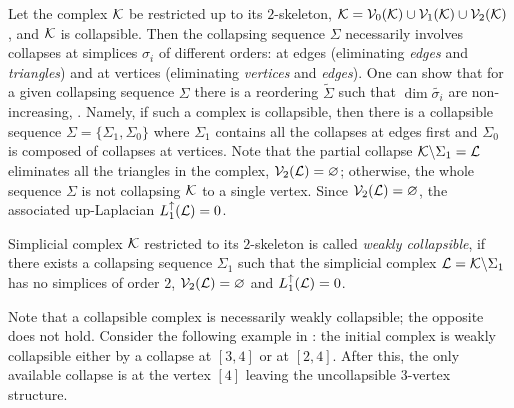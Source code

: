 Let the complex \( \mathcal{K} \) be restricted up to its \(2\)-skeleton, \( \mathcal{K} = \mathcal{V}_{0}(\mathcal{K}) \cup \mathcal{V}_{1}(\mathcal{K}) \cup \mathcal{V}_{2}(\mathcal{K}) \), and \( \mathcal{K} \) is collapsible. Then the collapsing sequence \( \Sigma \) necessarily involves collapses at simplices \( \sigma_i \) of different orders: at edges (eliminating \emph{edges} and \emph{triangles}) and at vertices (eliminating \emph{vertices} and \emph{edges}). One can show that for a given collapsing sequence \( \Sigma \) there is a reordering \( \tilde \Sigma \) such that \( \dim \tilde{\sigma_i} \) are non-increasing, {\cite[Lemma 2.5]{cohenSolving1laplaciansNearly2014}}. Namely, if such a complex is collapsible, then there is a collapsible sequence \( \Sigma = \{ \Sigma_1, \Sigma_0 \} \) where \( \Sigma_1 \) contains all the collapses at edges first and \( \Sigma_0 \) is composed of collapses at vertices. Note that the partial collapse \( \mathcal{K} \backslash \Sigma_1 = \mathcal{L} \) eliminates all the triangles in the complex, \( \mathcal{V}_2 (\mathcal{L}) = \varnothing \); otherwise, the whole sequence \( \Sigma \) is not collapsing \( \mathcal{K} \) to a single vertex. Since \( \mathcal{V}_2 (\mathcal{L} ) = \varnothing \), the associated up-Laplacian \( L_{1}^{\uparrow} ( \mathcal{L} ) = 0 \).

\begin{definition}
      Simplicial complex \( \mathcal{K} \) restricted to its \(2\)-skeleton is called \emph{weakly collapsible}, if there exists a collapsing sequence \( \Sigma_1 \) such that the simplicial complex \( \mathcal{L} = \mathcal{K} \backslash \Sigma_1 \) has no simplices of order \(2\), \( \mathcal{V}_2(\mathcal{L}) = \varnothing \) and \( L_{1}^{\uparrow} (\mathcal{L} ) = 0 \).
\end{definition}

\begin{example}
      Note that a collapsible complex is necessarily weakly collapsible; the opposite does not hold. Consider the following example in : the initial complex is weakly collapsible either by a collapse at \( [3, 4] \) or at \( [2, 4] \). After this, the only available collapse is at the vertex \([4]\) leaving the uncollapsible \(3\)-vertex structure.
\end{example}

